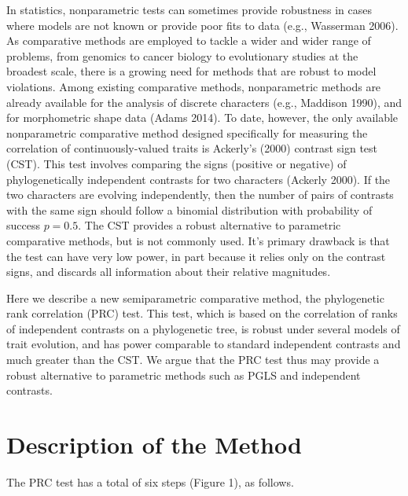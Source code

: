\documentclass[fleqn,10pt,lineno]{wlpeerj} %
\begin{document}
In statistics, nonparametric tests can sometimes provide robustness in cases where models are not known or provide poor fits to data (e.g., Wasserman 2006). As comparative methods are employed to tackle a wider and wider range of problems, from genomics to cancer biology to evolutionary studies at the broadest scale, there is a growing need for methods that are robust to model violations. Among existing comparative methods, nonparametric methods are already available for the analysis of discrete characters (e.g., Maddison 1990), and for morphometric shape data (Adams 2014). To date, however, the only available nonparametric comparative method designed specifically for measuring the correlation of continuously-valued traits is Ackerly's (2000) contrast sign test (CST). This test involves comparing the signs (positive or negative) of phylogenetically independent contrasts for two characters (Ackerly 2000). If the two characters are evolving independently, then the number of pairs of contrasts with the same sign should follow a binomial distribution with probability of success \(p=0.5\). The CST provides a robust alternative to parametric comparative methods, but is not commonly used. It's primary drawback is that the test can have very low power, in part because it relies only on the contrast signs, and discards all information about their relative magnitudes.

Here we describe a new semiparametric comparative method, the phylogenetic rank correlation (PRC) test. This test, which is based on the correlation of ranks of independent contrasts on a phylogenetic tree, is robust under several models of trait evolution, and has power comparable to standard independent contrasts and much greater than the CST. We argue that the PRC test thus may provide a robust alternative to parametric methods such as PGLS and independent contrasts.

\section{Description of the Method}\label{description-of-the-method}

The PRC test has a total of six steps (Figure 1), as follows.
\end{document}
